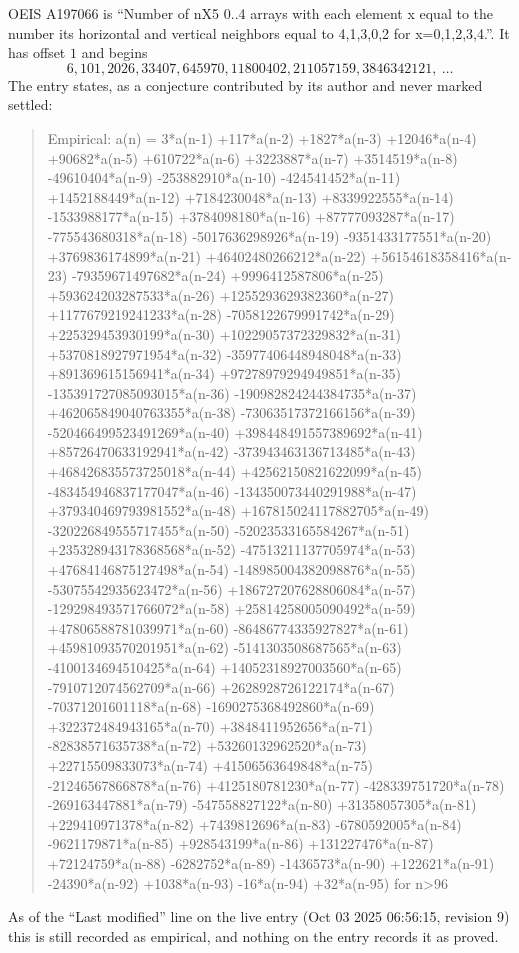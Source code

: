 \documentclass[11pt,a4paper]{article}
\theoremstyle{plain}
\theoremstyle{definition}
\begin{document}
OEIS A197066 is ``Number of nX5 0..4 arrays with each element x equal to the number its horizontal and vertical neighbors equal to 4,1,3,0,2 for x=0,1,2,3,4.''. It has offset $1$ and begins
\[
6, 101, 2026, 33407, 645970, 11800402, 211057159, 3846342121,\ \dots
\]
The entry states, as a conjecture contributed by its author and never marked settled:
\begin{quote}
Empirical: a(n) = 3*a(n-1) +117*a(n-2) +1827*a(n-3) +12046*a(n-4) +90682*a(n-5) +610722*a(n-6) +3223887*a(n-7) +3514519*a(n-8) -49610404*a(n-9) -253882910*a(n-10) -424541452*a(n-11) +1452188449*a(n-12) +7184230048*a(n-13) +8339922555*a(n-14) -1533988177*a(n-15) +3784098180*a(n-16) +87777093287*a(n-17) -775543680318*a(n-18) -5017636298926*a(n-19) -9351433177551*a(n-20) +3769836174899*a(n-21) +46402480266212*a(n-22) +56154618358416*a(n-23) -79359671497682*a(n-24) +9996412587806*a(n-25) +593624203287533*a(n-26) +1255293629382360*a(n-27) +1177679219241233*a(n-28) -7058122679991742*a(n-29) +225329453930199*a(n-30) +10229057372329832*a(n-31) +5370818927971954*a(n-32) -35977406448948048*a(n-33) +891369615156941*a(n-34) +97278979294949851*a(n-35) -135391727085093015*a(n-36) -190982824244384735*a(n-37) +462065849040763355*a(n-38) -73063517372166156*a(n-39) -520466499523491269*a(n-40) +398448491557389692*a(n-41) +85726470633192941*a(n-42) -373943463136713485*a(n-43) +468426835573725018*a(n-44) +42562150821622099*a(n-45) -483454946837177047*a(n-46) -134350073440291988*a(n-47) +379340469793981552*a(n-48) +167815024117882705*a(n-49) -320226849555717455*a(n-50) -52023533165584267*a(n-51) +235328943178368568*a(n-52) -47513211137705974*a(n-53) +47684146875127498*a(n-54) -148985004382098876*a(n-55) -53075542935623472*a(n-56) +186727207628806084*a(n-57) -129298493571766072*a(n-58) +25814258005090492*a(n-59) +47806588781039971*a(n-60) -86486774335927827*a(n-61) +45981093570201951*a(n-62) -5141303508687565*a(n-63) -4100134694510425*a(n-64) +14052318927003560*a(n-65) -7910712074562709*a(n-66) +2628928726122174*a(n-67) -70371201601118*a(n-68) -1690275368492860*a(n-69) +322372484943165*a(n-70) +3848411952656*a(n-71) -82838571635738*a(n-72) +53260132962520*a(n-73) +22715509833073*a(n-74) +41506563649848*a(n-75) -21246567866878*a(n-76) +4125180781230*a(n-77) -428339751720*a(n-78) -269163447881*a(n-79) -547558827122*a(n-80) +31358057305*a(n-81) +229410971378*a(n-82) +7439812696*a(n-83) -6780592005*a(n-84) -9621179871*a(n-85) +928543199*a(n-86) +131227476*a(n-87) +72124759*a(n-88) -6282752*a(n-89) -1436573*a(n-90) +122621*a(n-91) -24390*a(n-92) +1038*a(n-93) -16*a(n-94) +32*a(n-95) for n>96
\end{quote}
As of the ``Last modified'' line on the live entry (Oct 03 2025 06:56:15, revision 9) this is still
recorded as empirical, and nothing on the entry records it as proved.
\end{document}
